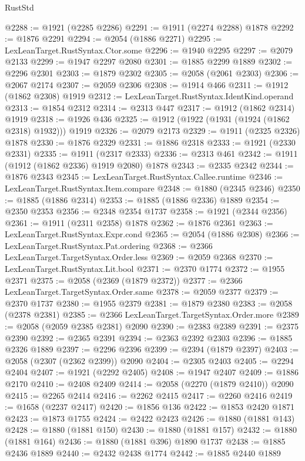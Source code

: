 \begin{lexlean}{RustStd}
\begin{coremodule}
@2288 := @1921 (@2285 @2286)
@2291 := @1911 (@2274 @2288) @1878
@2292 := @1876 @2291
@2294 := @2054 (@1886 @2271)
@2295 := LexLeanTarget.RustSyntax.Ctor.some
@2296 := @1940 @2295
@2297 := @2079 @2133
@2299 := @1947 @2297 @2080
@2301 := @1885 @2299 @1889
@2302 := @2296 @2301
@2303 := @1879 @2302
@2305 := @2058 (@2061 @2303)
@2306 := @2067 @2174
@2307 := @2059 @2306
@2308 := @1914 @466
@2311 := @1912 (@1862 @2308) @1919
@2312 := LexLeanTarget.RustSyntax.IdentKind.operand
@2313 := @1854 @2312
@2314 := @2313 @447
@2317 := @1912 (@1862 @2314) @1919
@2318 := @1926 @436
@2325 := @1912 (@1922 (@1931 (@1924 (@1862 @2318) @1932))) @1919
@2326 := @2079 @2173
@2329 := @1911 (@2325 @2326) @1878
@2330 := @1876 @2329
@2331 := @1886 @2318
@2333 := @1921 (@2330 @2331)
@2335 := @1911 (@2317 @2333)
@2336 := @2313 @461
@2342 := @1911 (@1912 (@1862 @2336) @1919 @2080) @1878
@2343 := @2335 @2342
@2344 := @1876 @2343
@2345 := LexLeanTarget.RustSyntax.Callee.runtime
@2346 := LexLeanTarget.RustSyntax.Item.compare
@2348 := @1880 (@2345 @2346)
@2350 := @1885 (@1886 @2314)
@2353 := @1885 (@1886 @2336) @1889
@2354 := @2350 @2353
@2356 := @2348 @2354 @1737
@2358 := @1921 (@2344 @2356)
@2361 := @1911 (@2311 @2358) @1878
@2362 := @1876 @2361
@2363 := LexLeanTarget.RustSyntax.Expr.cond
@2365 := @2054 (@1886 @2308)
@2366 := LexLeanTarget.RustSyntax.Pat.ordering
@2368 := @2366 LexLeanTarget.TargetSyntax.Order.less
@2369 := @2059 @2368
@2370 := LexLeanTarget.RustSyntax.Lit.bool
@2371 := @2370 @1774
@2372 := @1955 @2371
@2375 := @2058 (@2369 (@1879 @2372))
@2377 := @2366 LexLeanTarget.TargetSyntax.Order.same
@2378 := @2059 @2377
@2379 := @2370 @1737
@2380 := @1955 @2379
@2381 := @1879 @2380
@2383 := @2058 (@2378 @2381)
@2385 := @2366 LexLeanTarget.TargetSyntax.Order.more
@2389 := @2058 (@2059 @2385 @2381) @2090
@2390 := @2383 @2389
@2391 := @2375 @2390
@2392 := @2365 @2391
@2394 := @2363 @2392 @2303
@2396 := @1885 @2326 @1889
@2397 := @2296 @2396
@2399 := @2394 (@1879 @2397)
@2403 := @2058 (@2307 (@2362 @2399)) @2090
@2404 := @2305 @2403
@2405 := @2294 @2404
@2407 := @1921 (@2292 @2405)
@2408 := @1947 @2407
@2409 := @1886 @2170
@2410 := @2408 @2409
@2414 := @2058 (@2270 (@1879 @2410)) @2090
@2415 := @2265 @2414
@2416 := @2262 @2415
@2417 := @2260 @2416
@2419 := @1658 (@2237 @2417)
@2420 := @1856 @136
@2422 := @1853 @2420 @1871
@2423 := @1873 @1755
@2424 := @2422 @2423
@2426 := @1880 (@1881 @143)
@2428 := @1880 (@1881 @150)
@2430 := @1880 (@1881 @157)
@2432 := @1880 (@1881 @164)
@2436 := @1880 (@1881 @396) @1890 @1737
@2438 := @1885 @2436 @1889
@2440 := @2432 @2438 @1774
@2442 := @1885 @2440 @1889

\end{coremodule}
\end{lexlean}
